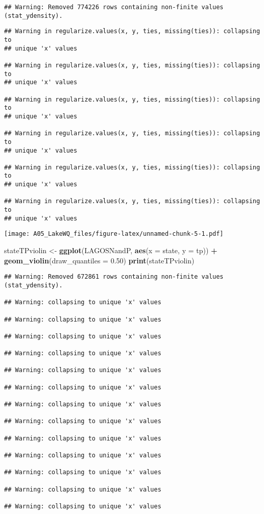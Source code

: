 \documentclass[]{article}
\newenvironment{Shaded}{\begin{snugshade}}{\end{snugshade}}
\newcommand{\DataTypeTok}[1]{\textcolor[rgb]{0.13,0.29,0.53}{#1}}
\newcommand{\FloatTok}[1]{\textcolor[rgb]{0.00,0.00,0.81}{#1}}
\newcommand{\KeywordTok}[1]{\textcolor[rgb]{0.13,0.29,0.53}{\textbf{#1}}}
\newcommand{\NormalTok}[1]{#1}
\newcommand{\OperatorTok}[1]{\textcolor[rgb]{0.81,0.36,0.00}{\textbf{#1}}}
\newcommand{\StringTok}[1]{\textcolor[rgb]{0.31,0.60,0.02}{#1}}
\begin{document}
\begin{verbatim}
## Warning: Removed 774226 rows containing non-finite values (stat_ydensity).
\end{verbatim}

\begin{verbatim}
## Warning in regularize.values(x, y, ties, missing(ties)): collapsing to
## unique 'x' values

## Warning in regularize.values(x, y, ties, missing(ties)): collapsing to
## unique 'x' values

## Warning in regularize.values(x, y, ties, missing(ties)): collapsing to
## unique 'x' values

## Warning in regularize.values(x, y, ties, missing(ties)): collapsing to
## unique 'x' values

## Warning in regularize.values(x, y, ties, missing(ties)): collapsing to
## unique 'x' values

## Warning in regularize.values(x, y, ties, missing(ties)): collapsing to
## unique 'x' values
\end{verbatim}

\texttt{[image: A05\_LakeWQ\_files/figure-latex/unnamed-chunk-5-1.pdf]}

\begin{Shaded}
\begin{Highlighting}[]
\NormalTok{stateTPviolin <-}\StringTok{ }\KeywordTok{ggplot}\NormalTok{(LAGOSNandP, }\KeywordTok{aes}\NormalTok{(}\DataTypeTok{x =}\NormalTok{ state, }\DataTypeTok{y =}\NormalTok{ tp)) }\OperatorTok{+}
\StringTok{  }\KeywordTok{geom_violin}\NormalTok{(}\DataTypeTok{draw_quantiles =} \FloatTok{0.50}\NormalTok{)}
\KeywordTok{print}\NormalTok{(stateTPviolin)}
\end{Highlighting}
\end{Shaded}

\begin{verbatim}
## Warning: Removed 672861 rows containing non-finite values (stat_ydensity).

## Warning: collapsing to unique 'x' values

## Warning: collapsing to unique 'x' values

## Warning: collapsing to unique 'x' values

## Warning: collapsing to unique 'x' values

## Warning: collapsing to unique 'x' values

## Warning: collapsing to unique 'x' values

## Warning: collapsing to unique 'x' values

## Warning: collapsing to unique 'x' values

## Warning: collapsing to unique 'x' values

## Warning: collapsing to unique 'x' values

## Warning: collapsing to unique 'x' values

## Warning: collapsing to unique 'x' values

## Warning: collapsing to unique 'x' values
\end{verbatim}
\end{document}
